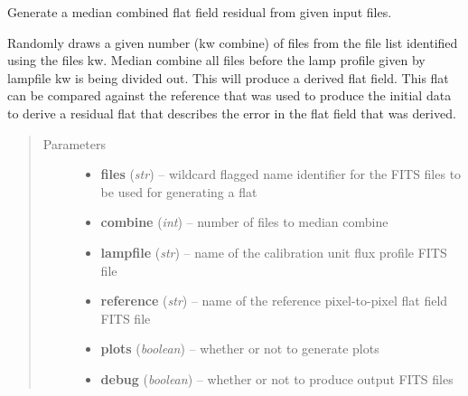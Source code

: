 \documentclass[a4paper,12pt,english]{sphinxmanual}
\begin{document}

\begin{fulllineitems}
\label{reduction:analysis.FlatfieldCalibration.generateResidualFlatField}
Generate a median combined flat field residual from given input files.

Randomly draws a given number (kw combine) of files from the file list identified using the files kw.
Median combine all files before the lamp profile given by lampfile kw is being divided out. This
will produce a derived flat field. This flat can be compared against the reference that was used
to produce the initial data to derive a residual flat that describes the error in the flat field
that was derived.
\begin{quote}\begin{description}
\item[{Parameters}] \leavevmode\begin{itemize}
\item {} 
\textbf{files} (\emph{str}) -- wildcard flagged name identifier for the FITS files to be used for generating a flat

\item {} 
\textbf{combine} (\emph{int}) -- number of files to median combine

\item {} 
\textbf{lampfile} (\emph{str}) -- name of the calibration unit flux profile FITS file

\item {} 
\textbf{reference} (\emph{str}) -- name of the reference pixel-to-pixel flat field FITS file

\item {} 
\textbf{plots} (\emph{boolean}) -- whether or not to generate plots

\item {} 
\textbf{debug} (\emph{boolean}) -- whether or not to produce output FITS files

\end{itemize}

\end{description}\end{quote}


\end{fulllineitems}
\end{document}
